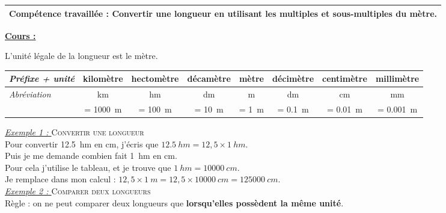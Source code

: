 \documentclass[12pt]{memoir}
\begin{document}
\linespread{1.5}

\begin{tabular}{*{1}{|p{18cm}}|}\hline
    \normalsize Compétence travaillée : Convertir une longueur en utilisant les multiples et sous-multiples du mètre.\\\hline
\end{tabular}

\vspace{2cm}

\textbf{\underline{Cours :}}
\par L'unité légale de la longueur est le mètre.

\begin{center}
\begin{tabular}{|p{2.7cm}*{7}{|c}|}\hline
    \textit{Préfixe + unité} & \textbf{kilo}mètre & \textbf{hecto}mètre & \textbf{déca}mètre & mètre & \textbf{déci}mètre & \textbf{centi}mètre & \textbf{milli}mètre \\\hline
    \textit{Abréviation} & \unit{\kilo\meter} & \unit{\hecto\meter} & \unit{\deca\meter} & \unit{\meter} & \unit{\deci\meter} & \unit{\centi\meter} & \unit{\milli\meter}\\\hline
    & = \qty{1000}{\meter} & = \qty{100}{\meter} & = \qty{10}{\meter} & = \qty{1}{\meter} & = \qty{0.1}{\meter} & = \qty{0.01}{\meter} & = \qty{0.001}{\meter}\\\hline
\end{tabular}
\end{center}

\textit{\underline{Exemple 1 : }} \textsc{Convertir une longueur}\\[-0.2cm]

Pour convertir \qty{12,5}{hm} en \unit{cm}, j'écris que $\qty{12,5}{hm} = 12,5 \times \qty{1}{hm}$.\\
Puis je me demande combien fait \qty{1}{hm} en \unit{cm}.\\
Pour cela j'utilise le tableau, et je trouve que $\qty{1}{hm} = \qty{10000}{cm}$.\\
Je remplace dans mon calcul : $12,5 \times \qty{1}{m} = 12,5 \times \qty{10000}{cm} = \qty{125000}{cm}$.\\

\textit{\underline{Exemple 2 : }} \textsc{Comparer deux longueurs}\\[-0.2cm]

Règle : on ne peut comparer deux longueurs que \textbf{lorsqu'elles possèdent la même unité}.\\[-0.2cm]
\end{document}
